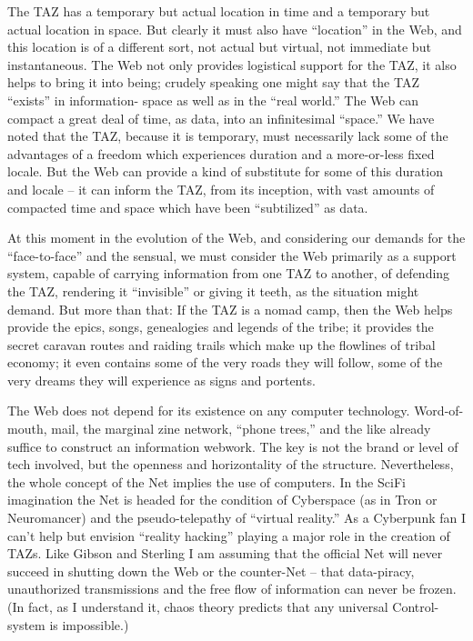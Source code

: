 \documentclass[a4paper,english,10pt,twoside]{article}
\begin{document}
\medskip
The TAZ has a temporary but actual location in time and a temporary but actual location in space. But clearly it must also have \enquote{location} in the Web, and this location is of a different sort, not actual but virtual, not immediate but instantaneous. The Web not only provides logistical support for the TAZ, it also helps to bring it into being; crudely speaking one might say that the TAZ \enquote{exists} in information- space as well as in the \enquote{real world.} The Web can compact a great deal of time, as data, into an infinitesimal \enquote{space.} We have noted that the TAZ, because it is temporary, must necessarily lack some of the advantages of a freedom which experiences duration and a more-or-less fixed locale. But the Web can provide a kind of substitute for some of this duration and locale -- it can inform the TAZ, from its inception, with vast amounts of compacted time and space which have been \enquote{subtilized} as data.

\medskip
At this moment in the evolution of the Web, and considering our demands for the \enquote{face-to-face} and the sensual, we must consider the Web primarily as a support system, capable of carrying information from one TAZ to another, of defending the TAZ, rendering it \enquote{invisible} or giving it teeth, as the situation might demand. But more than that: If the TAZ is a nomad camp, then the Web helps provide the epics, songs, genealogies and legends of the tribe; it provides the secret caravan routes and raiding trails which make up the flowlines of tribal economy; it even contains some of the very roads they will follow, some of the very dreams they will experience as signs and portents.

\medskip
The Web does not depend for its existence on any computer technology. Word-of-mouth, mail, the marginal zine network, \enquote{phone trees,} and the like already suffice to construct an information webwork. The key is not the brand or level of tech involved, but the openness and horizontality of the structure. Nevertheless, the whole concept of the Net implies the use of computers. In the SciFi imagination the Net is headed for the condition of Cyberspace (as in Tron or Neuromancer) and the pseudo-telepathy of \enquote{virtual reality.} As a Cyberpunk fan I can't help but envision \enquote{reality hacking} playing a major role in the creation of TAZs. Like Gibson and Sterling I am assuming that the official Net will never succeed in shutting down the Web or the counter-Net -- that data-piracy, unauthorized transmissions and the free flow of information can never be frozen. (In fact, as I understand it, chaos theory predicts that any universal Control-system is impossible.)
\end{document}
